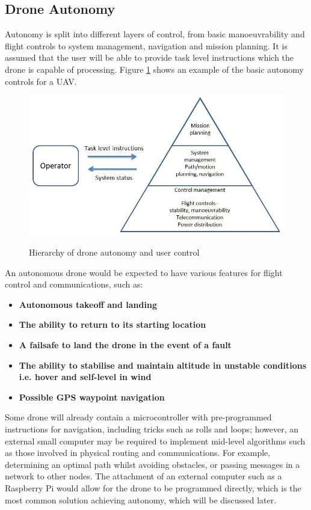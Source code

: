 \subsection{Drone Autonomy}
Autonomy is split into different layers of control, from basic manoeuvrability and flight controls to system management, navigation and mission planning. It is assumed that the user will be able to provide task level instructions which the drone is capable of processing. Figure \ref{autocont} shows an example of the basic autonomy controls for a UAV.

\begin{figure}
\centering	
\includegraphics[scale=0.4]{img/autopyra}
\label{autocont}	
\caption{Hierarchy of drone autonomy and user control}

\end{figure}

An autonomous drone would be expected to have various features for flight control and communications, such as:
\begin{itemize}
\item \textbf{Autonomous takeoff and landing}
\item \textbf{The ability to return to its starting location}
\item \textbf{A failsafe to land the drone in the event of a fault}
\item \textbf{The ability to stabilise and maintain altitude in unstable conditions i.e. hover and self-level in wind}
\item \textbf{Possible GPS waypoint navigation}
\end{itemize}
Some drone will already contain a microcontroller with pre-programmed instructions for navigation, including tricks such as rolls and loops; however, an external small computer may be required to implement mid-level algorithms such as those involved in physical routing and communications. For example, determining an optimal path whilst avoiding obstacles, or passing messages in a network to other nodes. The attachment of an external computer such as a Raspberry Pi would allow for the drone to be programmed directly, which is the most common solution achieving autonomy, which will be discussed later.

